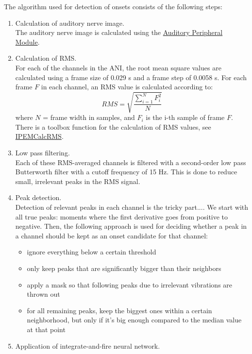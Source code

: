The algorithm used for detection of onsets consists of the
following steps:
\begin{enumerate}
\item Calculation of auditory nerve image.\\
    The auditory nerve image is calculated
    using the \hyperlink{Concepts:AuditoryPeripheralModule}{Auditory Peripheral Module}.
\item Calculation of RMS.\\
    For each of the channels in the ANI, the root mean square values are calculated using
    a frame size of 0.029 s and a frame step of 0.0058 s.
    For each frame $F$ in each channel, an RMS value is calculated according to:
    \begin{displaymath}
    RMS = \sqrt{\frac{\displaystyle \sum_{i=1}^{N}{F_{i}^2}}{N}}
    \end{displaymath}
    where $N$ = frame width in samples, and $F_{i}$ is the i-th sample of frame
    $F$.
    There is a toolbox function for the calculation of RMS values,
    see \hyperlink{FuncRef:IPEMCalcRMS}{IPEMCalcRMS}.
\item Low pass filtering.\\
    Each of these RMS-averaged channels is filtered with a second-order low pass Butterworth filter
    with a cutoff frequency of 15 Hz. This is done to reduce small, irrelevant peaks in the RMS signal.
\item Peak detection.\\
    Detection of relevant peaks in each channel is the tricky
    part....
    We start with all true peaks: moments where the first derivative goes from positive to negative.
    Then, the following approach is used for deciding whether a peak in a channel should be kept as an
    onset candidate for that channel:
    \begin{itemize}
    \item ignore everything below a certain threshold
    \item only keep peaks that are significantly bigger than their neighbors
    \item apply a mask so that following peaks due to irrelevant vibrations are thrown out
    \item for all remaining peaks, keep the biggest ones within a certain neighborhood, but only
          if it's big enough compared to the median value at that point
    \end{itemize}
\item Application of integrate-and-fire neural network.\\

\end{enumerate}
